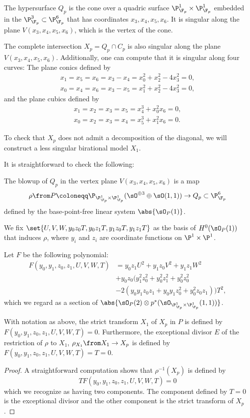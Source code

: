 The hypersurface $Q_p$ is the cone over a quadric surface $\P_{\F_p}^1 \times \P_{\F_p}^1$ embedded in the $\P_{\F_p}^3 \subset \P_{\F_p}^6$ that has coordinates $x_3,x_4,x_5,x_6$. It is singular along the plane $V(x_3,x_4,x_5,x_6)$, which is the vertex of the cone.

The complete intersection $X_p = Q_p \cap C_p$ is also singular along the plane $V(x_3,x_4,x_5,x_6)$. Additionally, one can compute that it is singular along four curves: The plane conics defined by
\begin{gather*}
  x_1=x_5=x_6=x_3-x_4=x_0^2 + x_2^2 -4x_3^2=0, \\
  x_0=x_4=x_6=x_3 - x_5=x_1^2 + x_2^2 -4 x_3^2=0,
\end{gather*}
and the plane cubics defined by
\begin{gather*}
  x_1=x_2=x_3=x_5=x_4^3+x_0^2x_6=0,\\
  x_0=x_2=x_3=x_4=x_5^3+x_1^2x_6=0.
\end{gather*}

To check that $X_p$ does not admit a decomposition of the diagonal, we will construct a less singular birational model $X_1$.

It is straightforward to check the following:
\begin{lemma}
	The blowup of $Q_p$ in the vertex plane $V(x_3,x_4,x_5,x_6)$ is a map 
	\[\rho \from P \coloneqq \P_{\P_{\F_p}^1 \times \P_{\F_p}^1}(\sO^{\oplus 3} \oplus \sO(1,1)) \to Q_p \subset \P_{\F_p}^6\]
	defined by the base-point-free linear system $\abs{\sO_P(1)}$.
\end{lemma}
We fix $\set{U,V,W,y_0z_0T,y_0z_1T,y_1z_0T,y_1z_1T}$ as the basis of $H^0(\sO_P(1))$ that induces $\rho$, where $y_i$ and $z_i$ are coordinate functions on $\P^1 \times \P^1$.

Let $F$ be the following polynomial:
\begin{equation}
\begin{aligned}
  \label{eq:X1}
  F(y_0,y_1,z_0,z_1,U,V,W,T)&=y_0z_1U^2 + y_1z_0 V^2 + y_1z_1W^2 \\
   &+ y_0z_0 \biggl(y_1^2z_0^2 + y_0^2z_1^2 + y_0^2z_0^2 \\
   &-2(y_0y_1z_0z_1 + y_0y_1z_0^2 + y_0^2z_0z_1) \biggr)T^2,
\end{aligned}
\end{equation}
 which we regard as a section of $\abs{\sO_P(2) \otimes p^*(\sO_{\P_{\F_p}^1 \times \P_{\F_p}^1}(1,1))}$.
\begin{lemma}
\label{lem:XpBlowup}
  With notation as above, the strict transform $X_1$ of $X_p$ in $P$ is defined by $F(y_0,y_1,z_0,z_1,U,V,W,T) = 0$. Furthermore, the exceptional divisor $E$ of the restriction of $\rho$ to $X_1$, $\rho_{X_1} \from X_1 \to X_p$ is defined by $F(y_0,y_1,z_0,z_1,U,V,W,T) = T = 0$.
\end{lemma}
\begin{proof}
  A straightforward computation shows that $\rho^{-1}(X_p)$ is defined by \[TF(y_0,y_1,z_0,z_1,U,V,W,T)=0\]
  which we recognize as having two components. The component defined by $T=0$ is the exceptional divisor and the other component is the strict transform of $X_p$.
\end{proof}


